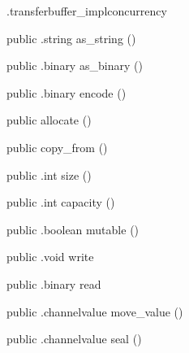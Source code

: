 \begin{CrexxClass}{.transferbuffer\_impl}{concurrency}
\begin{Members}
    \Method
      {public}
      {.string}
      {as\_string}
      {()}

    \Method
      {public}
      {.binary}
      {as\_binary}
      {()}

    \Method
      {public}
      {.binary}
      {encode}
      {()}

    \Factory
      {public}
      {allocate}
      {()}

    \Factory
      {public}
      {copy\_from}
      {()}

    \Method
      {public}
      {.int}
      {size}
      {()}

    \Method
      {public}
      {.int}
      {capacity}
      {()}

    \Method
      {public}
      {.boolean}
      {mutable}
      {()}

    \Method
      {public}
      {.void}
      {write}
      {}

    \Method
      {public}
      {.binary}
      {read}
      {}

    \Method
      {public}
      {.channelvalue}
      {move\_value}
      {()}

    \Method
      {public}
      {.channelvalue}
      {seal}
      {()}

  \end{Members}
\end{CrexxClass}

